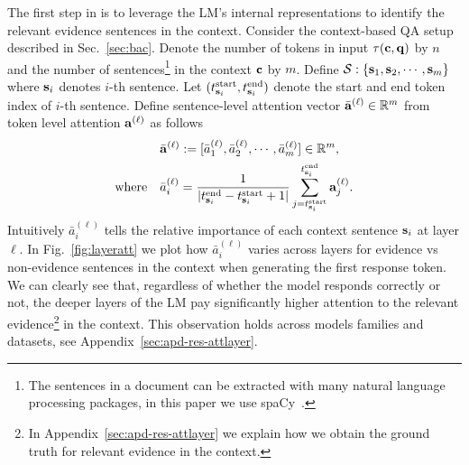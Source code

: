 The first step in \se is to leverage the LM's internal representations to identify the relevant evidence sentences in the context. Consider the context-based QA setup described in Sec.~\ref{sec:bac}. Denote the number of tokens in input $\tau({\mathbf{c}}, {\mathbf{q}})$ by $n$ and the number of sentences\footnote{The sentences in a document can be extracted with many natural language processing packages, in this paper we use spaCy~\cite{honnibal2017spacy}.} in the context ${\mathbf{c}}$ by $m$. Define ${\mathcal{S}}: \{{\mathbf{s}}_1, {\mathbf{s}}_2, \cdots, {\mathbf{s}}_m\}$ where ${\mathbf{s}}_i$ denotes $i$-th sentence. Let $(t_{{\mathbf{s}}_i}^\text{start}, t_{{\mathbf{s}}_i}^\text{end})$ denote the start and end token index of $i$-th sentence. Define sentence-level attention vector ${\bar{\mathbf{a}}}^{(\ell)} \in \mathbb{R}^m$ from token level attention ${\mathbf{a}}^{(\ell)}$ as follows
\begin{equation}
\label{eq:att-sent}
    \begin{aligned}
    &{\bar{\mathbf{a}}}^{(\ell)} := [\bar{a}_1^{(\ell)}, \bar{a}_2^{(\ell)}, \cdots, \bar{a}_m^{(\ell)}] \in \mathbb{R}^m, \\
    \text{where} \quad & \bar{a}_i^{(\ell)} = \frac{1}{|t_{{\mathbf{s}}_i}^\text{end} - t_{{\mathbf{s}}_i}^\text{start} + 1|}\sum\limits_{j=t_{{\mathbf{s}}_i}^\text{start}}^{t_{{\mathbf{s}}_i}^\text{end}} {\mathbf{a}}^{(\ell)}_j.    
    \end{aligned}
\end{equation}
Intuitively $\bar{a}_i^{(\ell)}$ tells the relative importance of each context sentence ${\mathbf{s}}_i$ at layer $\ell$. In Fig.~\ref{fig:layeratt} we plot how $\bar{a}_i^{(\ell)}$ varies across layers for evidence vs non-evidence sentences in the context when generating the first response token. We can clearly see that, regardless of whether the model responds correctly or not, the deeper layers of the LM pay significantly higher attention to the relevant evidence\footnote{In Appendix~\ref{sec:apd-res-attlayer} we explain how we obtain the ground truth for relevant evidence in the context.} in the context. This observation holds across models families and datasets, see Appendix~\ref{sec:apd-res-attlayer}.

